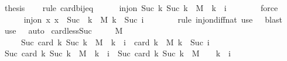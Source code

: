 \begin{isabellebody}
\ {\isacharquery}{\kern0pt}thesis\isanewline
\ \ \isamarkupfalse%
\ {\isacharparenleft}{\kern0pt}rule\ card{\isacharunderscore}{\kern0pt}bij{\isacharunderscore}{\kern0pt}eq{\isacharparenright}{\kern0pt}\isanewline
\ \ \ \ \isamarkupfalse%
\ {\isachardoublequoteopen}inj{\isacharunderscore}{\kern0pt}on\ Suc\ {\isacharbraceleft}{\kern0pt}k{\isachardot}{\kern0pt}\ Suc\ k\ {\isasymin}\ M\ {\isasymand}\ k\ {\isacharless}{\kern0pt}\ i{\isacharbraceright}{\kern0pt}{\isachardoublequoteclose}\isanewline
\ \ \ \ \ \ \isamarkupfalse%
\ force\isanewline
\ \ \ \ \isamarkupfalse%
\ {\isachardoublequoteopen}inj{\isacharunderscore}{\kern0pt}on\ {\isacharparenleft}{\kern0pt}{\isasymlambda}x{\isachardot}{\kern0pt}\ x\ {\isacharminus}{\kern0pt}\ Suc\ {}{\isacharparenright}{\kern0pt}\ {\isacharbraceleft}{\kern0pt}k\ {\isasymin}\ M{\isachardot}{\kern0pt}\ k\ {\isacharless}{\kern0pt}\ Suc\ i{\isacharbraceright}{\kern0pt}{\isachardoublequoteclose}\isanewline
\ \ \ \ \ \ \isamarkupfalse%
\ {\isacharparenleft}{\kern0pt}rule\ inj{\isacharunderscore}{\kern0pt}on{\isacharunderscore}{\kern0pt}diff{\isacharunderscore}{\kern0pt}nat{\isacharparenright}{\kern0pt}\ {\isacharparenleft}{\kern0pt}use\ {\isacharasterisk}{\kern0pt}\ \ blast{\isacharparenright}{\kern0pt}\isanewline
\ \ \isamarkupfalse%
\ {\isacharparenleft}{\kern0pt}use\ {\isacharasterisk}{\kern0pt}\ \ auto{\isacharparenright}{\kern0pt}\isanewline
{}\isamarkupfalse%
%
\endisatagproof
{\isafoldproof}%
%
\isadelimproof
\isanewline
%
\endisadelimproof
\isanewline
{}\isamarkupfalse%
\ card{\isacharunderscore}{\kern0pt}less{\isacharunderscore}{\kern0pt}Suc{\isacharcolon}{\kern0pt}\isanewline
\ \ \ {\isachardoublequoteopen}{}\ {\isasymin}\ M{\isachardoublequoteclose}\isanewline
\ \ \ \ \ {\isachardoublequoteopen}Suc\ {\isacharparenleft}{\kern0pt}card\ {\isacharbraceleft}{\kern0pt}k{\isachardot}{\kern0pt}\ Suc\ k\ {\isasymin}\ M\ {\isasymand}\ k\ {\isacharless}{\kern0pt}\ i{\isacharbraceright}{\kern0pt}{\isacharparenright}{\kern0pt}\ {\isacharequal}{\kern0pt}\ card\ {\isacharbraceleft}{\kern0pt}k\ {\isasymin}\ M{\isachardot}{\kern0pt}\ k\ {\isacharless}{\kern0pt}\ Suc\ i{\isacharbraceright}{\kern0pt}{\isachardoublequoteclose}\isanewline
%
\isadelimproof
%
\endisadelimproof
%
\isatagproof
{}\isamarkupfalse%
\ {\isacharminus}{\kern0pt}\isanewline
\ \ \isamarkupfalse%
\ {\isachardoublequoteopen}Suc\ {\isacharparenleft}{\kern0pt}card\ {\isacharbraceleft}{\kern0pt}k{\isachardot}{\kern0pt}\ Suc\ k\ {\isasymin}\ M\ {\isasymand}\ k\ {\isacharless}{\kern0pt}\ i{\isacharbraceright}{\kern0pt}{\isacharparenright}{\kern0pt}\ {\isacharequal}{\kern0pt}\ Suc\ {\isacharparenleft}{\kern0pt}card\ {\isacharbraceleft}{\kern0pt}k{\isachardot}{\kern0pt}\ Suc\ k\ {\isasymin}\ M\ {\isacharminus}{\kern0pt}\ {\isacharbraceleft}{\kern0pt}{}{\isacharbraceright}{\kern0pt}\ {\isasymand}\ k\ {\isacharless}{\kern0pt}\ i{\isacharbraceright}{\kern0pt}{\isacharparenright}{\kern0pt}{\isachardoublequoteclose}\isanewline

\end{isabellebody}
